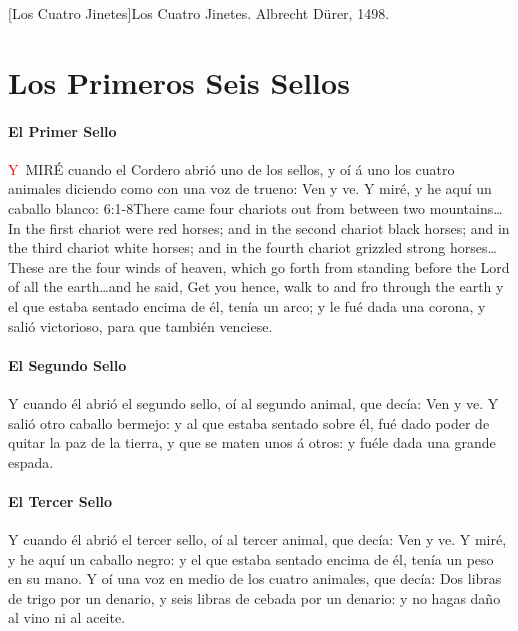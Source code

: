 [Los Cuatro Jinetes]{Los Cuatro Jinetes. Albrecht Dürer, 1498.}

\chapter{Los Primeros Seis Sellos}
\subsubsection*{El Primer Sello}
\lettrine[lines=3]{\textcolor{red}{Y}}{\ MIRÉ} cuando el Cordero abrió uno de los sellos, y oí á uno los cuatro animales diciendo como con una voz de trueno: Ven y ve. 
Y miré, y he aquí un caballo blanco:%
					{6:1-8}{There came four chariots out from between two mountains\ldots In the first chariot were red horses; and in the second chariot black horses; and in the third chariot white horses; and in the fourth chariot grizzled strong horses\ldots These are the four winds of heaven, which go forth from standing before the Lord of all the earth\ldots and he said, Get you hence, walk to and fro through the earth}
 y el que estaba sentado encima de él, tenía un arco; y le fué dada una corona, y salió victorioso, para que también venciese.
\subsubsection*{El Segundo Sello}
Y cuando él abrió el segundo sello, oí al segundo animal, que decía: Ven y ve. %
Y salió otro caballo bermejo: y al que estaba sentado sobre él, fué dado poder de quitar la paz de la tierra, y que se maten unos á otros: y fuéle dada una grande espada.
\subsubsection*{El Tercer Sello}
Y cuando él abrió el tercer sello, oí al tercer animal, que decía: Ven y ve. Y miré, y he aquí un caballo negro: y el que estaba sentado encima de él, tenía un peso en su mano. %
Y oí una voz en medio de los cuatro animales, que decía: Dos libras de trigo por un denario, y seis libras de cebada por un denario: y no hagas daño al vino ni al aceite.
